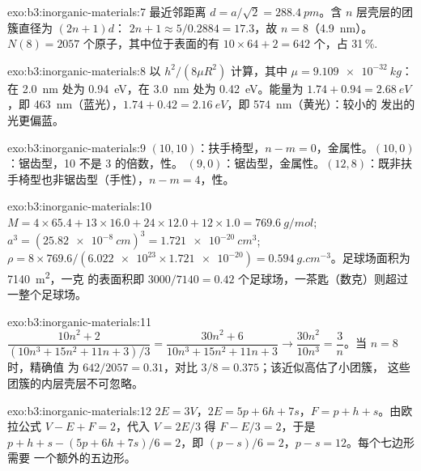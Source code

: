 \begin{solution}{exo:b3:inorganic-materials:7}
最近邻距离 $d = a/\sqrt2 = \qty{288.4}{pm}$。含 $n$ 层壳层的团簇直径为 $(2n + 1)d$：
$2n + 1 \approx 5/0.2884 = 17.3$，故 $n = 8$（\qty{4.9}{nm}）。$N(8) = 2057$ 个原子，其中位于表面的有 $10 \times 64 + 2 = 642$ 个，占
31\,\%.
\end{solution}

\begin{solution}{exo:b3:inorganic-materials:8}
以 $h^2/(8\mu R^2)$ 计算，其中 $\mu = \qty{9.109e-32}{kg}$：在 \qty{2.0}{nm} 处为 \qty{0.94}{eV}，在 \qty{3.0}{nm} 处为 \qty{0.42}{eV}。能量为
$1.74 + 0.94 = \qty{2.68}{eV}$，即 \qty{463}{nm}（蓝光），$1.74 + 0.42 = \qty{2.16}{eV}$，即 \qty{574}{nm}（黄光）：较小的
发出的光更偏蓝。
\end{solution}

\begin{solution}{exo:b3:inorganic-materials:9}
$(10, 10)$：扶手椅型，$n - m = 0$，金属性。$(10, 0)$：锯齿型，10 不是 3 的倍数，性。
$(9, 0)$：锯齿型，金属性。$(12, 8)$：既非扶手椅型也非锯齿型（手性），$n - m = 4$，性。
\end{solution}

\begin{solution}{exo:b3:inorganic-materials:10}
$M = 4 \times 65.4 + 13 \times 16.0 + 24 \times 12.0 + 12 \times 1.0 = \qty{769.6}{g/mol}$; $a^3 = (\qty{25.82e-8}{cm})^3 = \qty{1.721e-20}{cm^3}$;
$\rho = 8 \times 769.6/(\num{6.022e23} \times \num{1.721e-20}) = \qty{0.594}{g.cm^{-3}}$。足球场面积为 \qty{7140}{m^2}，一克
的表面积即 $3000/7140 = 0.42$ 个足球场，一茶匙（数克）则超过一整个足球场。
\end{solution}

\begin{solution}{exo:b3:inorganic-materials:11}
$\dfrac{10n^2 + 2}{(10n^3 + 15n^2 + 11n + 3)/3} = \dfrac{30n^2 + 6}{10n^3 + 15n^2 + 11n + 3} \to \dfrac{30n^2}{10n^3} = \dfrac3n$。当 $n = 8$ 时，精确值
为 $642/2057 = 0.31$，对比 $3/8 = 0.375$；该近似高估了小团簇，
这些团簇的内层壳层不可忽略。
\end{solution}

\begin{solution}{exo:b3:inorganic-materials:12}
$2E = 3V$，$2E = 5p + 6h + 7s$，$F = p + h + s$。由欧拉公式 $V - E + F = 2$，代入 $V = 2E/3$ 得 $F - E/3 = 2$，于是
$p + h + s - (5p + 6h + 7s)/6 = 2$，即 $(p - s)/6 = 2$，$p - s = 12$。每个七边形需要
一个额外的五边形。
\end{solution}

